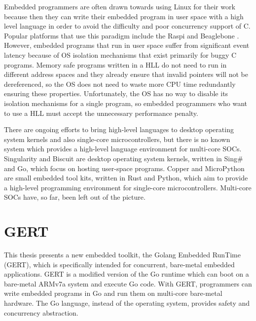 Embedded programmers are often drawn towards using Linux for their work
because then they can write their embedded program in user space with a
high level language in order to avoid the difficulty and poor concurrency
support of C. Popular platforms that use this paradigm include
the Raspi \cite{raspi} and Beaglebone \cite{beaglebone}.
However, embedded programs that run in user space suffer
from significant event latency because of OS isolation mechanisms that exist primarily
for buggy C programs. Memory safe programs written in a HLL do not need to run
in different address spaces and they already ensure that invalid pointers will not
be dereferenced, so the OS does not need to waste more CPU time redundantly ensuring
these properties. Unfortunately, the OS has no way to disable its isolation mechanisms
for a single program, so embedded programmers who want to use a HLL must accept the unnecessary
performance penalty.

There are ongoing efforts to bring high-level languages to desktop
operating system kernels and also single-core microcontrollers, but
there is no known system which provides a high-level language environment for
multi-core SOCs. Singularity \cite{singularity} and Biscuit \cite{biscuit} are desktop
operating system kernels, written in Sing\# and Go, which focus on
hosting user-space programs. Copper \cite{copper} and MicroPython \cite{micropython}
are small embedded tool kits, written in Rust and Python, which aim
to provide a high-level programming environment for single-core
microcontrollers. Multi-core SOCs have, so far, been left out of the
picture.

\section{GERT}

This thesis presents a new embedded toolkit, the Golang Embedded
RunTime (GERT), which is specifically intended for concurrent, bare-metal embedded applications.
GERT is a modified version of the Go runtime which can boot on a bare-metal ARMv7a system and execute Go code.
With GERT, programmers can write embedded programs in Go and run them on multi-core bare-metal hardware.
The Go language, instead of the operating system, provides safety and concurrency abstraction.

